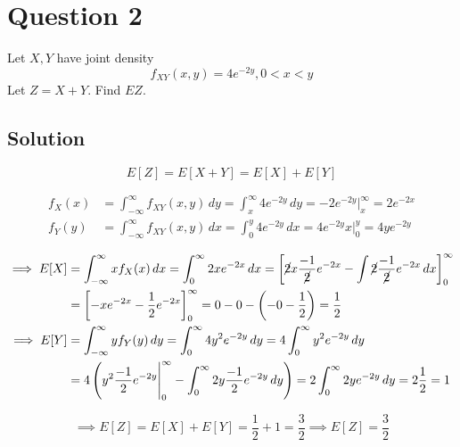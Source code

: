 \section*{Question 2}

Let \( X, Y \) have joint density
\[
    f_{X Y}(x, y)=4 e^{-2 y}, 0<x<y
\]
Let \( Z=X+Y \).
Find \( E Z \).

\subsection*{Solution}

\begin{equation*}
    E[Z]
    =
    E[X+Y]
    =
    E[X] + E[Y]
\end{equation*}

\begin{align*}
    f_X (x)
     & =
    \int_{-\infty}^{\infty} f_{X Y}(x, y) \, dy
    =
    \int_{x}^{\infty} 4 e^{-2 y} \, dy
    =
    -2 e^{-2 y} \Big|_{x}^{\infty}
    =
    2 e^{-2 x}
    \\
    f_Y (y)
     & =
    \int_{-\infty}^{\infty} f_{X Y}(x, y) \, dx
    =
    \int_{0}^{y} 4 e^{-2 y} \, dx
    =
    4 e^{-2 y} x \Big|_{0}^{y}
    =
    4 y e^{-2 y}
\end{align*}

\begin{align*}
    \implies
    E[X]
     & =
    \int_{-\infty}^{\infty} x f_X(x) \, dx
    =
    \int_{0}^{\infty} 2 x e^{-2 x} \, dx
        =
        {\left[
                \cancel{2} x \frac{-1}{\cancel{2}} e^{-2 x}
                -
                \int \cancel{2} \frac{-1}{\cancel{2}} e^{-2 x} \, dx
                \right]}_{0}^{\infty}
    \\ & =
    {\left[
        -x e^{-2 x}
        -
        \frac{1}{2} e^{-2 x}
        \right]}_{0}^{\infty}
    =
    0 - 0 - \left( -0 - \frac{1}{2} \right)
    =
    \frac{1}{2}
    \\
    \implies
    E[Y]
     & =
    \int_{-\infty}^{\infty} y f_Y(y) \, dy
    =
    \int_{0}^{\infty} 4 y^2 e^{-2 y} \, dy
    =
    4 \int_{0}^{\infty} y^2 e^{-2 y} \, dy
    \\ & =
    4 \left(
    y^2 \frac{-1}{2} e^{-2 y} \Bigg|_{0}^{\infty}
    - \int_{0}^{\infty} 2y \frac{-1}{2} e^{-2 y} \, dy
    \right)
    =
    2 \int_{0}^{\infty} 2y e^{-2 y} \, dy
    =
    2 \frac{1}{2}
    =
    1
\end{align*}

\begin{equation*}
    \implies
    E[Z]
    =
    E[X] + E[Y]
    =
    \frac{1}{2} + 1
    =
    \frac{3}{2}
    \implies
    \boxed{
        E[Z] = \frac{3}{2}
    }
\end{equation*}
